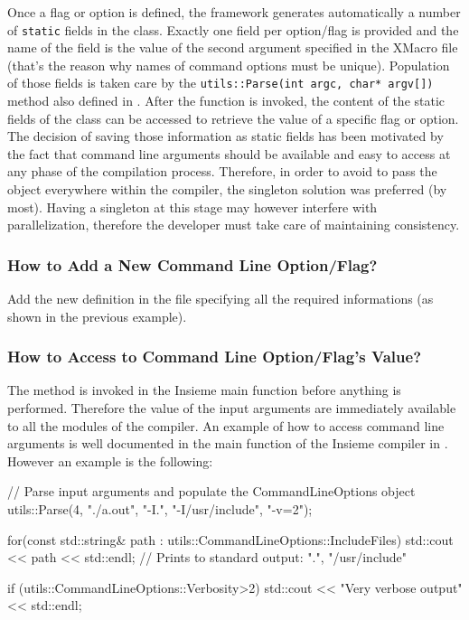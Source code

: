 Once a flag or option is defined, the framework generates automatically a number
of {\tt static} fields in the  class. Exactly
one field per option/flag is provided and the name of the field is the value of
the second argument specified in the XMacro file (that's the reason why names of
command options must be unique). Population of those fields is taken care by the
{\tt utils::Parse(int argc, char* argv[])} method also defined in
. After the  function is invoked,
the content of the static fields of the  class
can be accessed to retrieve the value of a specific flag or option. The decision
of saving those information as static fields has been motivated by the fact that
command line arguments should be available and easy to access at any phase of
the compilation process. Therefore, in order to avoid to pass the
 object everywhere within the compiler, the
singleton solution was preferred (by most). Having a singleton at this stage may
however interfere with parallelization, therefore the developer must take care
of maintaining consistency. 

\subsubsection{How to Add a New Command Line Option/Flag?}
Add the new definition in the  file specifying all the
required informations (as shown in the previous example).

\subsubsection{How to Access to Command Line Option/Flag's Value?}
The  method is invoked in the Insieme main function before
anything is performed. Therefore the value of the input arguments are
immediately available to all the modules of the compiler. An example of how to
access command line arguments is well documented in the main function of the
Insieme compiler in . However an example is the following:

\begin{srcCode}
// Parse input arguments and populate the CommandLineOptions object
utils::Parse(4, { "./a.out", "-I.", "-I/usr/include", "-v=2"}); 

for(const std::string& path : utils::CommandLineOptions::IncludeFiles) {
	std::cout << path << std::endl;
}
// Prints to standard output: ".", "/usr/include"

if (utils::CommandLineOptions::Verbosity>2) {
	std::cout << "Very verbose output" << std::endl;
}
\end{srcCode}

